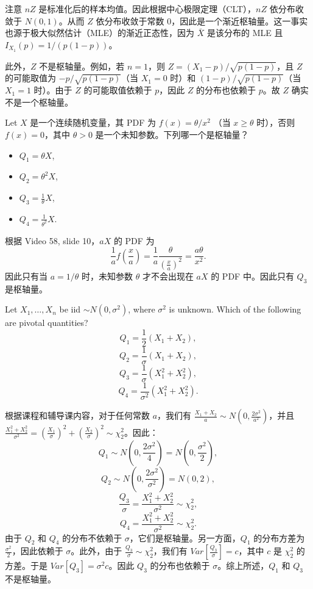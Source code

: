 \begin{questions}
\begin{solution}
注意 $nZ$ 是标准化后的样本均值。因此根据中心极限定理（CLT），$nZ$ 依分布收敛于 $N(0, 1)$。从而 $Z$ 依分布收敛于常数 $0$，因此是一个渐近枢轴量。这一事实也源于极大似然估计（MLE）的渐近正态性，因为 $\bar{X}$ 是该分布的 MLE 且 $I_{X_1}(p) = 1/(p(1 - p))$。

此外，$Z$ 不是枢轴量。例如，若 $n = 1$，则 $Z = (X_1 - p)/\sqrt{p(1 - p)}$，且 $Z$ 的可能取值为 $-p/\sqrt{p(1 - p)}$（当 $X_1 = 0$ 时）和 $(1 - p)/\sqrt{p(1 - p)}$（当 $X_1 = 1$ 时）。由于 $Z$ 的可能取值依赖于 $p$，因此 $Z$ 的分布也依赖于 $p$。故 $Z$ 确实不是一个枢轴量。
\end{solution}

\question Let $X$ 是一个连续随机变量，其 PDF 为 $f(x) = \theta / x^2$ （当 $x \ge \theta$ 时），否则 $f(x) = 0$，其中 $\theta > 0$ 是一个未知参数。下列哪一个是枢轴量？
\begin{itemize}
    \item $Q_1 = \theta X$,
    \item $Q_2 = \theta^2 X$,
    \item $Q_3 = \frac{1}{\theta} X$,
    \item $Q_4 = \frac{1}{\theta^2} X$.
\end{itemize}

\begin{solution}
根据 Video 58, slide 10，$aX$ 的 PDF 为
\[
\frac{1}{a} f\left( \frac{x}{a} \right) = \frac{1}{a} \frac{\theta}{\left( \frac{x}{a} \right)^2} = \frac{a\theta}{x^2}.
\]
因此只有当 $a = 1/\theta$ 时，未知参数 $\theta$ 才不会出现在 $aX$ 的 PDF 中。因此只有 $Q_3$ 是枢轴量。
\end{solution}

\question Let $X_1, \dots, X_n$ be iid $\sim N(0, \sigma^2)$, where $\sigma^2$ is unknown. Which of the following are pivotal quantities?
\[
Q_1 = \frac{1}{2}(X_1 + X_2),
\]
\[
Q_2 = \frac{1}{\sigma}(X_1 + X_2),
\]
\[
Q_3 = \frac{1}{\sigma}(X_1^2 + X_2^2),
\]
\[
Q_4 = \frac{1}{\sigma^2}(X_1^2 + X_2^2).
\]

\begin{solution}
根据课程和辅导课内容，对于任何常数 $a$，我们有 $\frac{X_1 + X_2}{a} \sim N\left(0, \frac{2\sigma^2}{a^2}\right)$，并且 $\frac{X_1^2 + X_2^2}{\sigma^2} = \left(\frac{X_1}{\sigma}\right)^2 + \left(\frac{X_2}{\sigma}\right)^2 \sim \chi_2^2$。因此：
\[
Q_1 \sim N\left(0, \frac{2\sigma^2}{4}\right) = N\left(0, \frac{\sigma^2}{2}\right),
\]
\[
Q_2 \sim N\left(0, \frac{2\sigma^2}{\sigma^2}\right) = N(0, 2),
\]
\[
\frac{Q_3}{\sigma} = \frac{X_1^2 + X_2^2}{\sigma^2} \sim \chi_2^2,
\]
\[
Q_4 = \frac{X_1^2 + X_2^2}{\sigma^2} \sim \chi_2^2.
\]
由于 $Q_2$ 和 $Q_4$ 的分布不依赖于 $\sigma$，它们是枢轴量。另一方面，$Q_1$ 的分布方差为 $\frac{\sigma^2}{2}$，因此依赖于 $\sigma$。此外，由于 $\frac{Q_3}{\sigma} \sim \chi_2^2$，我们有 $Var\left[\frac{Q_3}{\sigma}\right] = c$，其中 $c$ 是 $\chi_2^2$ 的方差。于是 $Var[Q_3] = \sigma^2 c$。因此 $Q_3$ 的分布也依赖于 $\sigma$。综上所述，$Q_1$ 和 $Q_3$ 不是枢轴量。
\end{solution}


\end{questions}
